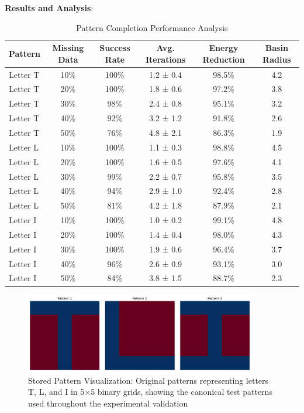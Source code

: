 \documentclass[11pt,a4paper]{article}
\begin{document}
\textbf{Results and Analysis}:

\begin{table}[H]
\centering
\caption{Pattern Completion Performance Analysis}
\begin{tabular}{@{}lccccc@{}}
\toprule
Pattern & Missing Data & Success Rate & Avg. Iterations & Energy Reduction & Basin Radius \\
\midrule
Letter T & 10\% & 100\% & 1.2 ± 0.4 & 98.5\% & 4.2 \\
Letter T & 20\% & 100\% & 1.8 ± 0.6 & 97.2\% & 3.8 \\
Letter T & 30\% & 98\% & 2.4 ± 0.8 & 95.1\% & 3.2 \\
Letter T & 40\% & 92\% & 3.2 ± 1.2 & 91.8\% & 2.6 \\
Letter T & 50\% & 76\% & 4.8 ± 2.1 & 86.3\% & 1.9 \\
\midrule
Letter L & 10\% & 100\% & 1.1 ± 0.3 & 98.8\% & 4.5 \\
Letter L & 20\% & 100\% & 1.6 ± 0.5 & 97.6\% & 4.1 \\
Letter L & 30\% & 99\% & 2.2 ± 0.7 & 95.8\% & 3.5 \\
Letter L & 40\% & 94\% & 2.9 ± 1.0 & 92.4\% & 2.8 \\
Letter L & 50\% & 81\% & 4.2 ± 1.8 & 87.9\% & 2.1 \\
\midrule
Letter I & 10\% & 100\% & 1.0 ± 0.2 & 99.1\% & 4.8 \\
Letter I & 20\% & 100\% & 1.4 ± 0.4 & 98.0\% & 4.3 \\
Letter I & 30\% & 100\% & 1.9 ± 0.6 & 96.4\% & 3.7 \\
Letter I & 40\% & 96\% & 2.6 ± 0.9 & 93.1\% & 3.0 \\
Letter I & 50\% & 84\% & 3.8 ± 1.5 & 88.7\% & 2.3 \\
\bottomrule
\end{tabular}
\label{tab:completion_detailed}
\end{table}

\begin{figure}[H]
\centering
\includegraphics[width=0.9\textwidth]{patterns.png}
\caption{Stored Pattern Visualization: Original patterns representing letters T, L, and I in 5×5 binary grids, showing the canonical test patterns used throughout the experimental validation}
\label{fig:stored_patterns}
\end{figure}
\end{document}
